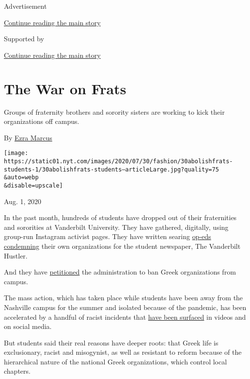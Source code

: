 Advertisement

\protect\hyperlink{after-top}{Continue reading the main story}

Supported by

\protect\hyperlink{after-sponsor}{Continue reading the main story}

\hypertarget{the-war-on-frats}{%
\section{The War on Frats}\label{the-war-on-frats}}

Groups of fraternity brothers and sorority sisters are working to kick
their organizations off campus.

By \href{https://www.nytimes.com/by/ezra-marcus}{Ezra Marcus}

\texttt{[image: https://static01.nyt.com/images/2020/07/30/fashion/30abolishfrats-students-1/30abolishfrats-students--articleLarge.jpg?quality=75\\\&auto=webp\\\&disable=upscale]}

Aug. 1, 2020

In the past month, hundreds of students have dropped out of their
fraternities and sororities at Vanderbilt University. They have
gathered, digitally, using group-run Instagram activist pages. They have
written searing
\href{https://vanderbilthustler.com/33211/featured/schulman-drop/}{op-eds}
\href{https://vanderbilthustler.com/33241/featured/guest-editorial-a-message-from-the-former-brothers-of-delta-tau-delta/}{condemning}
their own organizations for the student newspaper, The Vanderbilt
Hustler.

And they have
\href{https://www.change.org/p/vanderbilt-university-abolish-ifc-and-panhellenic-organizations-at-vanderbilt-university?utm_content=cl_sharecopy_23388057_en-US\%3A6\&recruiter=316950555\&recruited_by_id=962f0bd0-1382-11e5-9061-9518c3aa4d04\&utm_source=share_petitio}{petitioned}
the administration to ban Greek organizations from campus.

The mass action, which has taken place while students have been away
from the Nashville campus for the summer and isolated because of the
pandemic, has been accelerated by a handful of racist incidents that
\href{https://news.vanderbilt.edu/2020/07/07/vanderbilt-university-statement-on-greek-life/}{have
been surfaced} in videos and on social media.

But students said their real reasons have deeper roots: that Greek life
is exclusionary, racist and misogynist, as well as resistant to reform
because of the hierarchical nature of the national Greek organizations,
which control local chapters.

